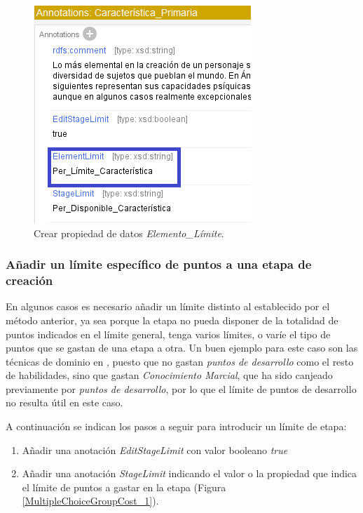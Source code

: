 \begin{enumerate}
    \begin{figure}[H]
        \centering
        \includegraphics[scale=0.8]{Figures/Protege/ElementLimit_3.png}
        \caption{Crear propiedad de datos \textit{Elemento\_Límite}.}
        \label{ElementLimit_3}
    \end{figure}
\end{enumerate}

\subsubsection{Añadir un límite específico de puntos a una etapa de creación}\label{SpecificLimit}
En algunos casos es necesario añadir un límite distinto al establecido por el método anterior, ya sea porque la etapa no pueda 
disponer de la totalidad de puntos indicados en el límite general, tenga varios límites, o varíe el tipo de puntos que se gastan 
de una etapa a otra. Un buen ejemplo para este caso son las técnicas de dominio en \anima, 
puesto que no gastan \textit{puntos de desarrollo} como el resto de habilidades, sino que gastan 
\textit{Conocimiento Marcial}, que ha sido canjeado previamente por \textit{puntos de desarrollo}, 
por lo que el límite de puntos de desarrollo no resulta útil en este caso.\medskip

A continuación se indican los pasos a seguir para introducir un límite de etapa:
\begin{enumerate}
    \item Añadir una anotación \textit{EditStageLimit} con valor booleano \textit{true}
    \item Añadir una anotación \textit{StageLimit} indicando el valor 
    o la propiedad que indica el límite de puntos a gastar en la etapa (Figura \ref*{MultipleChoiceGroupCost_1}).
\end{enumerate}

